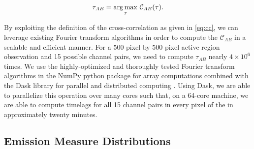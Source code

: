 \begin{equation}
    \tau_{AB} = \argmax_{\tau}\,\mathcal{C}_{AB}(\tau).
\end{equation}

\begin{figure}
    \caption{}    
\end{figure}

By exploiting the definition of the cross-correlation as given in \autoref{eq:cc}, we can leverage existing Fourier transform algorithms in order to compute the $\mathcal{C}_{AB}$ in a scalable and efficient manner. For a 500 pixel by 500 pixel active region observation and 15 possible channel pairs, we need to compute $\tau_{AB}$ nearly $4\times10^6$ times. We use the highly-optimized and thoroughly tested Fourier transform algorithms in the NumPy python package for array computations \citep{oliphant_guide_2006} combined with the Dask library for parallel and distributed computing \citep{dask_development_team_dask_2016}. Using Dask, we are able to parallelize this operation over many cores such that, on a 64-core machine, we are able to compute timelags for all 15 channel pairs in every pixel of the \AR in approximately twenty minutes. 

\begin{figure}
    \caption{}
\end{figure}

\subsection{Emission Measure Distributions}\label{em_dist}

